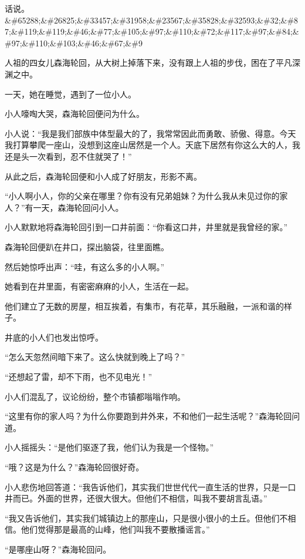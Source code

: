 
\begin{this_body}

话说。\&\#65288;\&\#26825;\&\#33457;\&\#31958;\&\#23567;\&\#35828;\&\#32593;\&\#32;\&\#87;\&\#119;\&\#119;\&\#46;\&\#77;\&\#105;\&\#97;\&\#110;\&\#72;\&\#117;\&\#97;\&\#84;\&\#97;\&\#110;\&\#103;\&\#46;\&\#67;\&\#9

人祖的四女儿森海轮回，从大树上掉落下来，没有跟上人祖的步伐，困在了平凡深渊之中。

一天，她在睡觉，遇到了一位小人。

小人嚎啕大哭，森海轮回便问为什么。

小人说：“我是我们部族中体型最大的了，我常常因此而勇敢、骄傲、得意。今天我打算攀爬一座山，没想到这座山居然是一个人。天底下居然有你这么大的人，我还是头一次看到，忍不住就哭了！”

从此之后，森海轮回便和小人成了好朋友，形影不离。

“小人啊小人，你的父亲在哪里？你有没有兄弟姐妹？为什么我从未见过你的家人？”有一天，森海轮回问小人。

小人默默地将森海轮回引到一口井前面：“你看这口井，井里就是我曾经的家。”

森海轮回便趴在井口，探出脑袋，往里面瞧。

然后她惊呼出声：“哇，有这么多的小人啊。”

她看到在井里面，有密密麻麻的小人，生活在一起。

他们建立了无数的房屋，相互挨着，有集市，有花草，其乐融融，一派和谐的样子。

井底的小人们也发出惊呼。

“怎么天忽然间暗下来了。这么快就到晚上了吗？”

“还想起了雷，却不下雨，也不见电光！”

小人们混乱了，议论纷纷，整个市镇都嗡嗡作响。

“这里有你的家人吗？为什么你要跑到井外来，不和他们一起生活呢？”森海轮回问道。

小人摇摇头：“是他们驱逐了我，他们认为我是一个怪物。”

“哦？这是为什么？”森海轮回很好奇。

小人悲伤地回答道：“我告诉他们，其实我们世世代代一直生活的世界，只是一口井而已。外面的世界，还很大很大。但他们不相信，叫我不要胡言乱语。”

“我又告诉他们，其实我们城镇边上的那座山，只是很小很小的土丘。但他们不相信。他们觉得那是最高的山峰，他们叫我不要散播谣言。”

“是哪座山呀？”森海轮回问。


\end{this_body}
